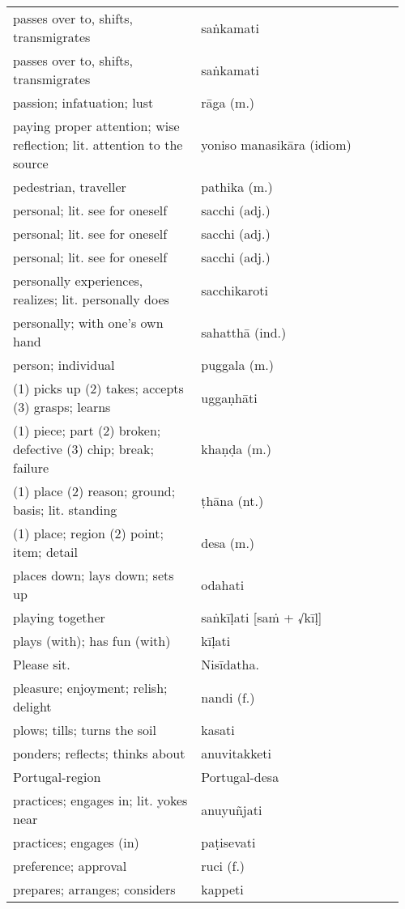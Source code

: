 \documentclass[a5paper]{memoir}
\begin{document}
\begin{longtable}{L{0.48\linewidth} L{0.48\linewidth} H}
passes over to, shifts, transmigrates & saṅkamati & \\[0pt]
passes over to, shifts, transmigrates & saṅkamati & \\[0pt]
passion; infatuation; lust & rāga (m.) & \\[0pt]
paying proper attention; wise reflection; lit. attention to the source & yoniso manasikāra (idiom) & \\[0pt]
pedestrian, traveller & pathika (m.) & \\[0pt]
personal; lit. see for oneself & sacchi (adj.) & \\[0pt]
personal; lit. see for oneself & sacchi (adj.) & \\[0pt]
personal; lit. see for oneself & sacchi (adj.) & \\[0pt]
personally experiences, realizes; lit. personally does & sacchikaroti & \\[0pt]
personally; with one’s own hand & sahatthā (ind.) & \\[0pt]
person; individual & puggala (m.) & \\[0pt]
(1) picks up (2) takes; accepts (3) grasps; learns & uggaṇhāti & \\[0pt]
(1) piece; part (2) broken; defective (3) chip; break; failure & khaṇḍa (m.) & \\[0pt]
(1) place (2) reason; ground; basis;  lit. standing & ṭhāna (nt.) & \\[0pt]
(1) place; region (2) point; item; detail & desa (m.) & \\[0pt]
places down; lays down; sets up & odahati & \\[0pt]
playing together & saṅkīḷati [saṁ + √kīḷ] & \\[0pt]
plays (with); has fun (with) & kīḷati & \\[0pt]
Please sit. & Nisīdatha. & \\[0pt]
pleasure; enjoyment; relish; delight & nandi (f.) & \\[0pt]
plows; tills; turns the soil & kasati & \\[0pt]
ponders; reflects; thinks about & anuvitakketi & \\[0pt]
Portugal-region & Portugal-desa & \\[0pt]
practices; engages in; lit. yokes near & anuyuñjati & \\[0pt]
practices; engages (in) & paṭisevati & \\[0pt]
preference; approval & ruci (f.) & \\[0pt]
prepares; arranges; considers & kappeti & \\[0pt]

\end{longtable}
\end{document}
